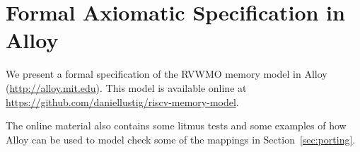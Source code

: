 \section{Formal Axiomatic Specification in Alloy}
\label{sec:alloy}

\lstset{language=alloy}
\lstset{aboveskip=0pt}
\lstset{belowskip=0pt}

We present a formal specification of the RVWMO memory model in Alloy (\url{http://alloy.mit.edu}).
This model is available online at \url{https://github.com/daniellustig/riscv-memory-model}.

The online material also contains some litmus tests and some examples of how Alloy can be used to model check some of the mappings in Section~\ref{sec:porting}.

